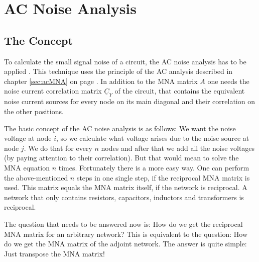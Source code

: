 %
%
%
%

\chapter{AC Noise Analysis}

\section{The Concept}

To calculate the small signal noise of a circuit, the AC noise
analysis has to be applied \cite{Blum}.  This technique uses the
principle of the AC analysis described in chapter \ref{sec:acMNA} on
page \pageref{sec:acMNA}.  In addition to the MNA matrix $A$ one needs
the noise current correlation matrix $\underline{C}_Y$ of the circuit,
that contains the equivalent noise current sources for every node on
its main diagonal and their correlation on the other positions.

\addvspace{12pt}

The basic concept of the AC noise analysis is as follows: We want the
noise voltage at node $i$, so we calculate what voltage arises due to
the noise source at node $j$.  We do that for every $n$ nodes and
after that we add all the noise voltages (by paying attention to their
correlation).  But that would mean to solve the MNA equation $n$
times.  Fortunately there is a more easy way.  One can perform the
above-mentioned $n$ steps in one single step, if the reciprocal MNA
matrix is used.  This matrix equals the MNA matrix itself, if the
network is reciprocal.  A network that only contains resistors,
capacitors, inductors and transformers is reciprocal.

\addvspace{12pt}

The question that needs to be answered now is: How do we get the
reciprocal MNA matrix for an arbitrary network? This is equivalent to
the question: How do we get the MNA matrix of the adjoint network.
The answer is quite simple: Just transpose the MNA matrix!

